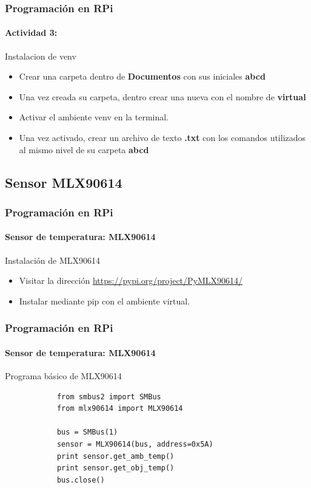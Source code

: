 \documentclass{beamer}
\begin{document}
		\begin{frame}
		\frametitle{Programación en RPi}
		\framesubtitle{Actividad 3:}
		\begin{mybox}{Instalacion de venv}
			\begin{itemize}
				\item Crear una carpeta dentro de \textbf{Documentos} con sus iniciales \textbf{abcd}
				\item Una vez creada su carpeta, dentro crear una nueva con el nombre de \textbf{virtual}
				\item Activar el ambiente venv en la terminal.
				\item Una vez activado, crear un archivo de texto \textbf{.txt} con los comandos utilizados al mismo nivel de su carpeta \textbf{abcd}
			\end{itemize}
		\end{mybox}
	\end{frame}
	\subsection{Sensor MLX90614}
	\begin{frame}
		\frametitle{Programación en RPi}
		\framesubtitle{Sensor de temperatura: MLX90614}
		
		\begin{mybox}{Instalación de MLX90614}
			\begin{itemize}
				\item Visitar la dirección \url{https://pypi.org/project/PyMLX90614/}
				\item Instalar mediante pip con el ambiente virtual.
			\end{itemize}
		\end{mybox}
		
	\end{frame}
	
	\begin{frame}[fragile]
		\frametitle{Programación en RPi}
		\framesubtitle{Sensor de temperatura: MLX90614}
		\begin{mybox}{Programa básico de MLX90614}
		\begin{lstlisting}
			from smbus2 import SMBus
			from mlx90614 import MLX90614
			
			bus = SMBus(1)
			sensor = MLX90614(bus, address=0x5A)
			print sensor.get_amb_temp()
			print sensor.get_obj_temp()
			bus.close()
		\end{lstlisting}
		\end{mybox}
	\end{frame}
	
\end{document}
